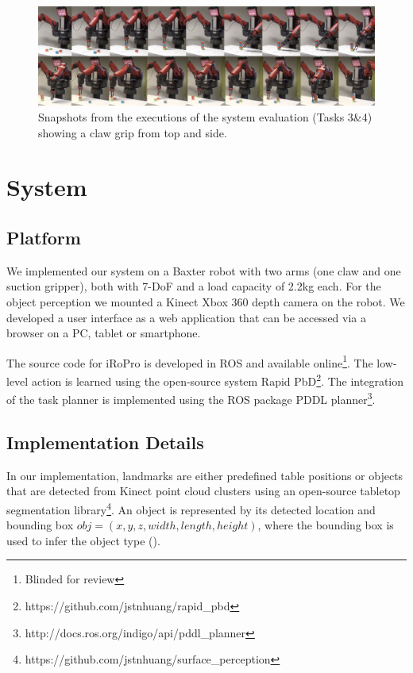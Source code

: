 \begin{figure}[t]
\centering
 \includegraphics[width=\linewidth]{figures/filmstrip.png}
\caption{Snapshots from the executions of the system evaluation (Tasks 3\&4) showing a claw grip from top and side.}
\label{fig:filmstrip}
\end{figure}
\section{System}
\label{sec:system}
\subsection{Platform}
\label{sec:platform}
We implemented our system on a Baxter robot with two arms (one claw and one suction gripper), both with 7-DoF and a load capacity of 2.2kg each.
For the object perception we mounted a Kinect Xbox 360 depth camera on the robot.
We developed a user interface as a web application that can be accessed via a browser on a PC, tablet or smartphone.

The source code for iRoPro is developed in ROS \cite{quigley2009ros} and available online\footnote{Blinded for review}. %
The low-level action is learned using the open-source system Rapid PbD\footnote{https://github.com/jstnhuang/rapid\_pbd}.
The integration of the task planner is implemented using the ROS package PDDL planner\footnote{http://docs.ros.org/indigo/api/pddl\_planner}.

\subsection{Implementation Details}
\label{sec:implementation}
In our implementation, landmarks are either predefined table positions or 
objects that are detected from Kinect point cloud clusters using an open-source tabletop segmentation library\footnote{https://github.com/jstnhuang/surface\_perception}.
An object is represented by its detected location and bounding box $obj = (x,y,z, width, length, height)$, where the bounding box is used to infer the object type ().


